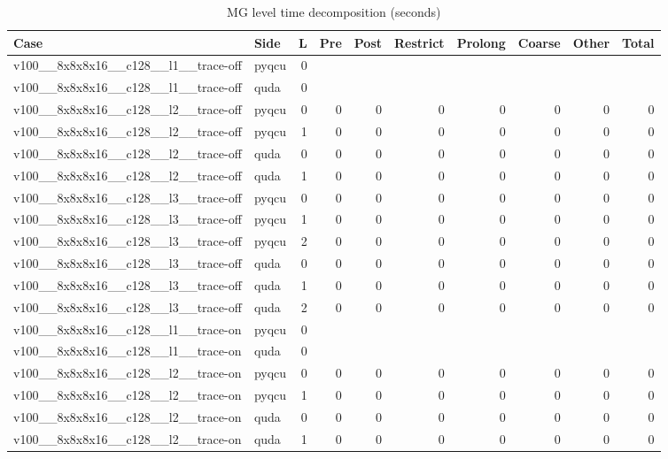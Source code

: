 
\begin{table}[htbp]
\centering
\caption{MG level time decomposition (seconds)}
\small
\begin{tabular}{@{}llrrrrrrrr@{}}
\toprule
Case & Side & L & Pre & Post & Restrict & Prolong & Coarse & Other & Total \\
\midrule
v100\_\_8x8x8x16\_\_c128\_\_l1\_\_trace-off & pyqcu & 0 &  &  &  &  &  &  &  \\
v100\_\_8x8x8x16\_\_c128\_\_l1\_\_trace-off & quda & 0 &  &  &  &  &  &  &  \\
v100\_\_8x8x8x16\_\_c128\_\_l2\_\_trace-off & pyqcu & 0 & 0 & 0 & 0 & 0 & 0 & 0 & 0 \\
v100\_\_8x8x8x16\_\_c128\_\_l2\_\_trace-off & pyqcu & 1 & 0 & 0 & 0 & 0 & 0 & 0 & 0 \\
v100\_\_8x8x8x16\_\_c128\_\_l2\_\_trace-off & quda & 0 & 0 & 0 & 0 & 0 & 0 & 0 & 0 \\
v100\_\_8x8x8x16\_\_c128\_\_l2\_\_trace-off & quda & 1 & 0 & 0 & 0 & 0 & 0 & 0 & 0 \\
v100\_\_8x8x8x16\_\_c128\_\_l3\_\_trace-off & pyqcu & 0 & 0 & 0 & 0 & 0 & 0 & 0 & 0 \\
v100\_\_8x8x8x16\_\_c128\_\_l3\_\_trace-off & pyqcu & 1 & 0 & 0 & 0 & 0 & 0 & 0 & 0 \\
v100\_\_8x8x8x16\_\_c128\_\_l3\_\_trace-off & pyqcu & 2 & 0 & 0 & 0 & 0 & 0 & 0 & 0 \\
v100\_\_8x8x8x16\_\_c128\_\_l3\_\_trace-off & quda & 0 & 0 & 0 & 0 & 0 & 0 & 0 & 0 \\
v100\_\_8x8x8x16\_\_c128\_\_l3\_\_trace-off & quda & 1 & 0 & 0 & 0 & 0 & 0 & 0 & 0 \\
v100\_\_8x8x8x16\_\_c128\_\_l3\_\_trace-off & quda & 2 & 0 & 0 & 0 & 0 & 0 & 0 & 0 \\
v100\_\_8x8x8x16\_\_c128\_\_l1\_\_trace-on & pyqcu & 0 &  &  &  &  &  &  &  \\
v100\_\_8x8x8x16\_\_c128\_\_l1\_\_trace-on & quda & 0 &  &  &  &  &  &  &  \\
v100\_\_8x8x8x16\_\_c128\_\_l2\_\_trace-on & pyqcu & 0 & 0 & 0 & 0 & 0 & 0 & 0 & 0 \\
v100\_\_8x8x8x16\_\_c128\_\_l2\_\_trace-on & pyqcu & 1 & 0 & 0 & 0 & 0 & 0 & 0 & 0 \\
v100\_\_8x8x8x16\_\_c128\_\_l2\_\_trace-on & quda & 0 & 0 & 0 & 0 & 0 & 0 & 0 & 0 \\
v100\_\_8x8x8x16\_\_c128\_\_l2\_\_trace-on & quda & 1 & 0 & 0 & 0 & 0 & 0 & 0 & 0 \\

\end{tabular}
\end{table}
